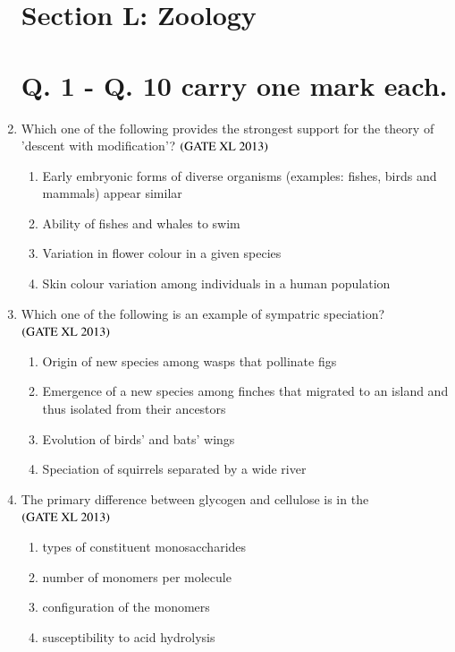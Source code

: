 \documentclass[journal]{IEEEtran}
\begin{document}
\begin{enumerate}
\section*{Section L: Zoology}

\section*{Q. 1 - Q. 10 carry one mark each.}

\item Which one of the following provides the strongest support for the theory of 'descent with modification'? \hfill $\left(\text{GATE XL 2013}\right)$
\begin{enumerate}
    \item Early embryonic forms of diverse organisms (examples: fishes, birds and mammals) appear similar
    \item Ability of fishes and whales to swim
    \item Variation in flower colour in a given species
    \item Skin colour variation among individuals in a human population
\end{enumerate}

\item Which one of the following is an example of sympatric speciation? \hfill $\left(\text{GATE XL 2013}\right)$
\begin{enumerate}
    \item Origin of new species among wasps that pollinate figs
    \item Emergence of a new species among finches that migrated to an island and thus isolated from their ancestors
    \item Evolution of birds' and bats' wings
    \item Speciation of squirrels separated by a wide river
\end{enumerate}

\item The primary difference between glycogen and cellulose is in the \hfill $\left(\text{GATE XL 2013}\right)$
\begin{enumerate}
    \item types of constituent monosaccharides
    \item number of monomers per molecule
    \item configuration of the monomers
    \item susceptibility to acid hydrolysis
\end{enumerate}


\end{enumerate}
\end{document}
